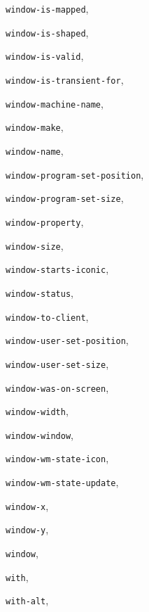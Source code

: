 \begin{theindex}
\item {\tt window-is-mapped}, {\bf\pageref{window-is-mapped}}
\item {\tt window-is-shaped}, {\bf\pageref{window-is-shaped}}
\item {\tt window-is-valid}, {\bf\pageref{window-is-valid}}
\item {\tt window-is-transient-for}, {\bf\pageref{window-is-transient-for}}
\item {\tt window-machine-name}, {\bf\pageref{window-machine-name}}
\item {\tt window-make}, {\bf\pageref{window-make}}
\item {\tt window-name}, {\bf\pageref{window-name}}
\item {\tt window-program-set-position}, {\bf\pageref{window-program-set-position}}
\item {\tt window-program-set-size}, {\bf\pageref{window-program-set-size}}
\item {\tt window-property}, {\bf\pageref{window-property}}
\item {\tt window-size}, {\bf\pageref{window-size}}
\item {\tt window-starts-iconic}, {\bf\pageref{window-starts-iconic}}
\item {\tt window-status}, {\bf\pageref{window-status}}
\item {\tt window-to-client}, {\bf\pageref{window-to-client}}
\item {\tt window-user-set-position}, {\bf\pageref{window-user-set-position}}
\item {\tt window-user-set-size}, {\bf\pageref{window-user-set-size}}
\item {\tt window-was-on-screen}, {\bf\pageref{window-was-on-screen}}
\item {\tt window-width}, {\bf\pageref{window-width}}
\item {\tt window-window}, {\bf\pageref{window-window}}
\item {\tt window-wm-state-icon}, {\bf\pageref{window-wm-state-icon}}
\item {\tt window-wm-state-update}, {\bf\pageref{window-wm-state-update}}
\item {\tt window-x}, {\bf\pageref{window-x}}
\item {\tt window-y}, {\bf\pageref{window-y}}
\item {\tt window}, {\bf\pageref{window}}
\item {\tt with}, {\bf\pageref{with}}
\item {\tt with-alt}, {\bf\pageref{with-alt}}

\end{theindex}
